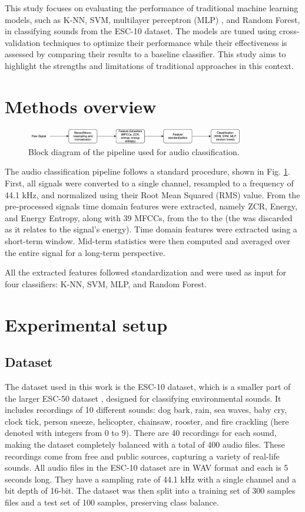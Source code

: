 \documentclass[journal]{IEEEtran}
\begin{document}
This study focuses on evaluating the performance of traditional machine learning models, such as K-NN, SVM, multilayer perceptron (MLP) , and Random Forest, in classifying sounds from the ESC-10 dataset. The models are tuned using cross-validation techniques to optimize their performance while their effectiveness is assessed by comparing their results to a baseline classifier. This study aims to highlight the strengths and limitations of traditional approaches in this context.

\section{Methods overview}

\begin{figure}[h]
    \centering
    \includegraphics[width=\linewidth, height=0.65cm]{pipeline.png}
    \caption{Block diagram of the pipeline used for audio classification.}
    \label{fig:pipeling}
\end{figure}

The audio classification pipeline follows a standard procedure, shown in Fig. \ref{fig:pipeling}. First, all signals were converted to a single channel, resampled to a frequency of 44.1 kHz, and normalized using their Root Mean Squared (RMS) value. From the pre-processed signals time domain features were extracted, namely ZCR, Energy, and Energy Entropy, along with 39 MFCCs, from the  to the  (the  was discarded as it relates to the signal's energy). Time domain features were extracted using a short-term window. Mid-term statistics were then computed and averaged over the entire signal for a long-term perspective.

All the extracted features followed standardization and were used as input for four classifiers: K-NN, SVM, MLP, and Random Forest.

\section{Experimental setup}
\subsection{Dataset}
The dataset used in this work is the ESC-10 dataset, which is a smaller part of the larger ESC-50 dataset \cite{esc-50}, designed for classifying environmental sounds. It includes recordings of 10 different sounds: dog bark, rain, sea waves, baby cry, clock tick, person sneeze, helicopter, chainsaw, rooster, and fire crackling (here denoted with integers from 0 to 9). There are 40 recordings for each sound, making the dataset completely balanced with a total of 400 audio files. These recordings come from free and public sources, capturing a variety of real-life sounds. All audio files in the ESC-10 dataset are in WAV format and each is 5 seconds long. They have a sampling rate of 44.1 kHz with a single channel and a bit depth of 16-bit.
The dataset was then split into a training set of 300 samples files and a test set of 100 samples, preserving class balance.
\end{document}
